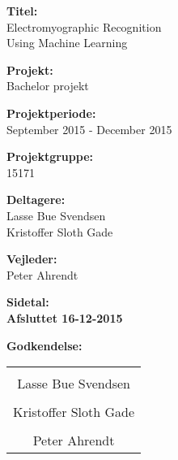 \begin{minipage}[t]{0.68\textwidth}
\textbf{Titel:} \\[5pt]\hspace*{2ex}
Electromyographic Recognition\\\hspace*{2ex}
Using Machine Learning\\\hspace*{2ex}

\textbf{Projekt:} \\[5pt]\bigskip\hspace{2ex}
Bachelor projekt

\textbf{Projektperiode:} \\[5pt]\bigskip\hspace{2ex}
September 2015 - December 2015

\textbf{Projektgruppe:} \\[5pt]\bigskip\hspace{2ex}
15171

\textbf{Deltagere:} \\[5pt]\hspace*{2ex}
Lasse Bue Svendsen\\\hspace*{2ex}
Kristoffer Sloth Gade \\\hspace*{2ex}


\textbf{Vejleder:} \\[5pt]\hspace*{2ex}
Peter Ahrendt \\\bigskip\hspace{2ex}

\vspace*{4cm}

\textbf{Sidetal: \pageref{SidsteSide}} \\
\textbf{Afsluttet 16-12-2015}

\end{minipage}
\hfill
\begin{minipage}[t]{0.483\textwidth}
	\textbf{Godkendelse:}\vspace{2cm}
	
\begin{tabular}{c}
	\underline{\phantom{mmmmmmmmmmmmmm}}  \\
	Lasse Bue Svendsen \vspace{2cm}\\
	\underline{\phantom{mmmmmmmmmmmmmm}} \\
	Kristoffer Sloth Gade \vspace{2cm}	\\
	\underline{\phantom{mmmmmmmmmmmmmm}} \\
	Peter Ahrendt \vspace{2cm}	\\
\end{tabular}

\end{minipage}

\vfill


